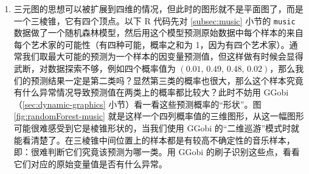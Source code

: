 \documentclass[
  b5paper,
  UTF8,twoside]{book}
\newenvironment{Shaded}{\begin{snugshade}}{\end{snugshade}}
\newcommand{\AttributeTok}[1]{\textcolor[rgb]{0.77,0.63,0.00}{#1}}
\newcommand{\CommentTok}[1]{\textcolor[rgb]{0.56,0.35,0.01}{\textit{#1}}}
\newcommand{\DecValTok}[1]{\textcolor[rgb]{0.00,0.00,0.81}{#1}}
\newcommand{\FunctionTok}[1]{\textcolor[rgb]{0.00,0.00,0.00}{#1}}
\newcommand{\NormalTok}[1]{#1}
\newcommand{\OtherTok}[1]{\textcolor[rgb]{0.56,0.35,0.01}{#1}}
\newcommand{\SpecialCharTok}[1]{\textcolor[rgb]{0.00,0.00,0.00}{#1}}
\newcommand{\StringTok}[1]{\textcolor[rgb]{0.31,0.60,0.02}{#1}}
\begin{document}
\begin{enumerate}
\def\labelenumi{\arabic{enumi}.}
\item
  三元图的思想可以被扩展到四维的情况，但此时的图形就不是平面图了，而是一个三棱锥，它有四个顶点。以下 R 代码先对 \ref{subsec:music} 小节的 \texttt{music} 数据做了一个随机森林模型，然后用这个模型预测原始数据中每个样本的来自每个艺术家的可能性（有四种可能，概率之和为 1，因为有四个艺术家）。通常我们取最大可能的预测为一个样本的因变量预测值，但这样做有时候会显得武断，对数据探索不够，例如四个概率值为 \((0.01,\,0.49,\,0.48,\,0.02)\)，那么我们的预测结果一定是第二类吗？显然第三类的概率也很大，那么这个样本究竟有什么异常情况导致预测值在两类上的概率都比较大？此时不妨用 GGobi （\ref{sec:dynamic-graphics} 小节）看一看这些预测概率的``形状''。图 \ref{fig:randomForest-music} 就是这样一个四列概率值的三维图形，从这一幅图形可能很难感受到它是棱锥形状的，当我们使用 GGobi 的``二维巡游''模式时就能看清楚了。在三棱锥中间位置上的样本都是有较高不确定性的音乐样本，即：很难判断它们究竟该预测为哪一类。用 GGobi 的刷子识别这些点，看看它们对应的原始变量值是否有什么异常。

\begin{Shaded}
\end{Shaded}


\end{enumerate}
\end{document}
